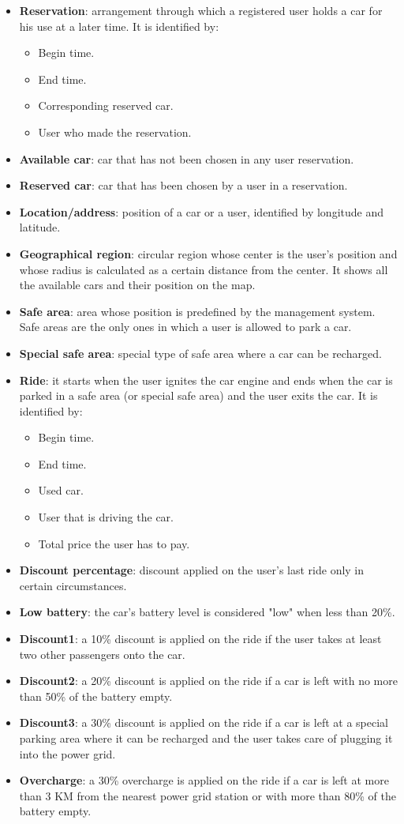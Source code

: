 \begin{itemize}
	\item \textbf{Reservation}: arrangement through which a registered user holds a car for his use at a later time. It is identified by:
	\begin{itemize}
		\item Begin time.
		\item End time.
		\item Corresponding reserved car.
		\item User who made the reservation.
	\end{itemize}
	\item \textbf{Available car}: car that has not been chosen in any user reservation.
	\item \textbf{Reserved car}: car that has been chosen by a user in a reservation. 
	\item \textbf{Location/address}: position of a car or a user, identified by longitude and latitude. 
	\item \textbf{Geographical region}: circular region whose center is the user's position and whose radius is calculated as a certain distance from the center. It shows all the available cars and their position on the map. 
	\item \textbf{Safe area}: area whose position is predefined by the management system. Safe areas are the only ones in which a user is allowed to park a car. 
	\item \textbf{Special safe area}: special type of safe area where a car can be recharged.
	\item \textbf{Ride}: it starts when the user ignites the car engine and ends when the car is parked in a safe area (or special safe area) and the user exits the car. It is identified by: 
	\begin{itemize}
		\item Begin time.
		\item End time.
		\item Used car.
		\item User that is driving the car.
		\item Total price the user has to pay.
	\end{itemize}
	\item \textbf{Discount percentage}: discount applied on the user's last ride only in certain circumstances. 
	\item \textbf{Low battery}: the car's battery level is considered "low" when less than 20\%. 
	\item \textbf{Discount1}: a 10\% discount is applied on the ride if the user takes at least two other passengers onto the car.
	\item \textbf{Discount2}: a 20\% discount is applied on the ride if a car is left with no more than 50\% of the battery empty.
	\item \textbf{Discount3}: a 30\% discount is applied on the ride if a car is left at a special parking area where it can be recharged and the user takes care of  plugging it into the power grid.
	\item \textbf{Overcharge}: a 30\% overcharge is applied on the ride if a car is left at more than 3 KM from the nearest power grid station or with more than 80\% of the battery empty.
\end{itemize}
\newpage
